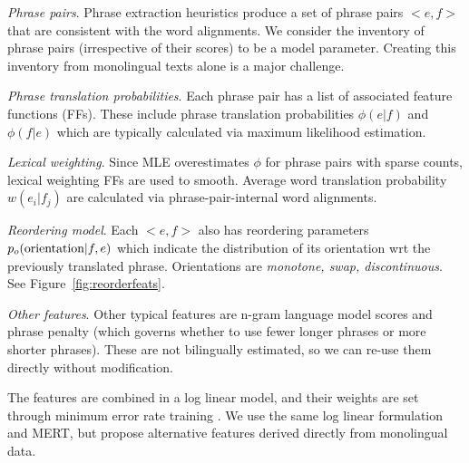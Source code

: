 \documentclass[11pt]{article}
\DeclareMathOperator*{\argmax}{arg\,max}
\newcommand{\figref}[1]{Figure~\ref{#1}}
\newenvironment{my_itemize}{
\begin{itemize}
  \setlength{\itemsep}{2pt}
  \setlength{\parskip}{2pt}
  \setlength{\parsep}{1pt}}{\end{itemize}
}
\begin{document}
\begin{my_itemize}
\item \emph{Phrase pairs}.  
Phrase extraction heuristics \cite{Venugopal2003,Tillmann2003,Och2004} produce a set of phrase pairs ${<e, f>}$ that are consistent with the word alignments.  We consider the inventory of phrase pairs (irrespective of their scores) to be a model parameter.  
Creating this inventory from monolingual texts alone is a major challenge.

\item \emph{Phrase translation probabilities}.  Each phrase pair has a list of associated feature functions (FFs).  These include phrase translation probabilities ${\phi(e|f)}$ and ${\phi(f|e)}$ which are  typically calculated via maximum likelihood estimation. 

\item \emph{Lexical weighting}.  Since MLE overestimates ${\phi}$ for phrase pairs with sparse counts, lexical weighting FFs are used to smooth.  Average word translation probability ${w(e_i|f_j)}$ are calculated via phrase-pair-internal word alignments.

\item \emph{Reordering model}.  Each ${<e, f>}$ also has reordering parameters $p_o(\textnormal{orientation}|f,e)$ which indicate the distribution of its orientation wrt the previously translated phrase. Orientations are {\it monotone, swap, discontinuous}. See \figref{fig:reorderfeats}.
\cite{tillman:2004:HLTNAACL,Kumar2004} 


\item \emph{Other features}. Other typical features are n-gram language model scores and phrase penalty (which governs whether to use fewer longer phrases or more shorter phrases).  These are not bilingually estimated, so we can re-use them directly without modification. 
\end{my_itemize}

\noindent
The features are combined in a log linear model, and their weights are set through minimum error rate training \cite{Och2003c}.
We use the same log linear formulation and MERT, but propose alternative features derived directly from monolingual data.
\end{document}
